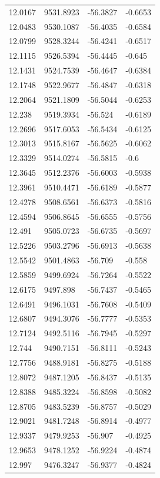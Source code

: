 \begin{table}[H]
\begin{tabular}{llll}
12.0167 & 9531.8923 & -56.3827 & -0.6653 \\
12.0483 & 9530.1087 & -56.4035 & -0.6584 \\
12.0799 & 9528.3244 & -56.4241 & -0.6517 \\
12.1115 & 9526.5394 & -56.4445 & -0.645 \\
12.1431 & 9524.7539 & -56.4647 & -0.6384 \\
12.1748 & 9522.9677 & -56.4847 & -0.6318 \\
12.2064 & 9521.1809 & -56.5044 & -0.6253 \\
12.238 & 9519.3934 & -56.524 & -0.6189 \\
12.2696 & 9517.6053 & -56.5434 & -0.6125 \\
12.3013 & 9515.8167 & -56.5625 & -0.6062 \\
12.3329 & 9514.0274 & -56.5815 & -0.6 \\
12.3645 & 9512.2376 & -56.6003 & -0.5938 \\
12.3961 & 9510.4471 & -56.6189 & -0.5877 \\
12.4278 & 9508.6561 & -56.6373 & -0.5816 \\
12.4594 & 9506.8645 & -56.6555 & -0.5756 \\
12.491 & 9505.0723 & -56.6735 & -0.5697 \\
12.5226 & 9503.2796 & -56.6913 & -0.5638 \\
12.5542 & 9501.4863 & -56.709 & -0.558 \\
12.5859 & 9499.6924 & -56.7264 & -0.5522 \\
12.6175 & 9497.898 & -56.7437 & -0.5465 \\
12.6491 & 9496.1031 & -56.7608 & -0.5409 \\
12.6807 & 9494.3076 & -56.7777 & -0.5353 \\
12.7124 & 9492.5116 & -56.7945 & -0.5297 \\
12.744 & 9490.7151 & -56.8111 & -0.5243 \\
12.7756 & 9488.9181 & -56.8275 & -0.5188 \\
12.8072 & 9487.1205 & -56.8437 & -0.5135 \\
12.8388 & 9485.3224 & -56.8598 & -0.5082 \\
12.8705 & 9483.5239 & -56.8757 & -0.5029 \\
12.9021 & 9481.7248 & -56.8914 & -0.4977 \\
12.9337 & 9479.9253 & -56.907 & -0.4925 \\
12.9653 & 9478.1252 & -56.9224 & -0.4874 \\
12.997 & 9476.3247 & -56.9377 & -0.4824 \\

\end{tabular}
\end{table}
